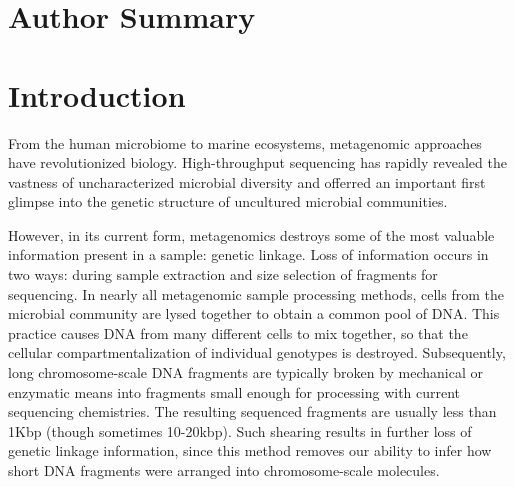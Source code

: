 \documentclass[10pt]{article}
\begin{document}
\section*{Author Summary}

\section*{Introduction}

From the human microbiome to marine ecosystems, metagenomic approaches have revolutionized biology. High-throughput sequencing has rapidly revealed the vastness of uncharacterized microbial diversity and offerred an important first glimpse into the genetic structure of uncultured microbial communities.

However, in its current form, metagenomics destroys some of the most valuable information present in a sample: genetic linkage. 
Loss of information occurs in two ways: during sample extraction and size selection of fragments for sequencing.
In nearly all metagenomic sample processing methods, cells from the microbial community are lysed together to obtain a common pool of DNA.
This practice causes DNA from many different cells to mix together, so that the cellular compartmentalization of individual genotypes is destroyed.
Subsequently, long chromosome-scale DNA fragments are typically broken by mechanical or enzymatic means into fragments small enough for processing with current sequencing chemistries. 
The resulting sequenced fragments are usually less than 1Kbp (though sometimes 10-20kbp). 
Such shearing results in further loss of  genetic linkage information, since this method removes our ability to infer how short DNA fragments were arranged into chromosome-scale molecules.
\end{document}
